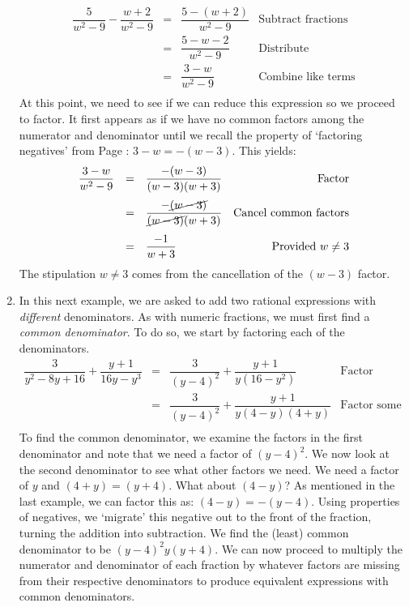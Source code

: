 \documentclass{ximera}
\begin{document}
\begin{example}
\begin{enumerate}
\[\begin{array}{rclr}
\dfrac{5}{w^2 - 9} - \dfrac{w+2}{w^2-9} & = & \dfrac{5 - (w+2)}{w^2 - 9}& \text{Subtract fractions}\\ [13pt]
                                        & = & \dfrac{5 - w - 2}{w^2-9} & \text{Distribute} \\ [13pt]
																				& = & \dfrac{3-w}{w^2-9} & \text{Combine like terms} \\ \end{array}\]
At this point, we need to see if we can reduce this expression so we proceed to factor.  It first appears as if we have no common factors among the numerator and denominator until we recall the property of `factoring negatives' from Page \pageref{propertiesofnegatives}:  $3-w = -(w-3)$. This yields:\[ \begin{array}{rclr}

\dfrac{3-w}{w^2-9} & = & \dfrac{-(w-3)}{(w-3)(w+3)} & \text{Factor} \\ [13pt]
                   & = & \dfrac{-\cancel{(w-3)}}{\cancel{(w-3)}(w+3)} & \text{Cancel common factors} \\ [13pt]
									 & = & \dfrac{-1}{w+3} & \text{Provided $w \neq 3$} \\ 
									\end{array}\]
The stipulation $w \neq 3$ comes from the cancellation of the $(w-3)$ factor.

\item  	In this next example, we are asked to add two rational expressions with \textit{different} denominators.  As with numeric fractions, we must first find a \textit{common denominator}. To do so, we start by factoring each of the denominators. \[ \begin{array}{rclr}

\dfrac{3}{y^2 - 8y + 16} + \dfrac{y+1}{16y - y^3} & = & \dfrac{3}{(y-4)^2} + \dfrac{y+1}{y(16 - y^2)} & \text{Factor} \\	[13pt]		
                                                  & = & \dfrac{3}{(y-4)^2} + \dfrac{y+1}{y(4-y)(4+y)} & \text{Factor some more} \\
																									
																									\end{array}\]
To find the common denominator, we examine the factors in the first denominator and note that we need a factor of $(y-4)^2$.  We now look at the second denominator to see what other factors we need. We need a factor of $y$ and $(4+y) = (y+4)$.  What about $(4-y)$?  As mentioned in the last example, we can factor this as: $(4-y) = -(y-4)$. Using properties of negatives, we `migrate' this negative out to the front of the fraction, turning the addition into subtraction.  We find the (least) common denominator to be $(y-4)^2 y (y+4)$.  We can now proceed to multiply the numerator and denominator of each fraction by whatever factors are missing from their respective denominators to produce equivalent expressions with common denominators. \[ \begin{array}{rclr}


\end{array}\]
\end{enumerate}
\end{example}
\end{document}
